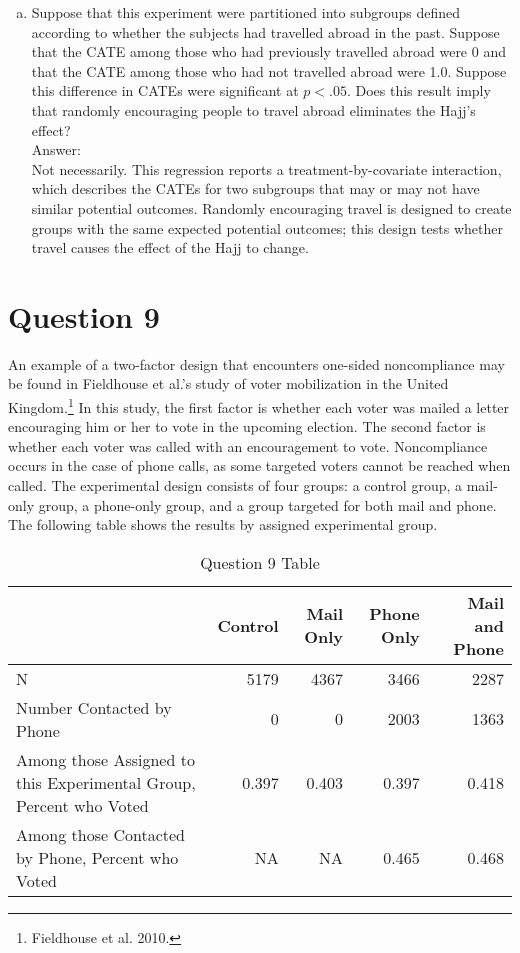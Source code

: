 \documentclass[11pt,notitlepage]{article}\usepackage[]{graphicx}\usepackage[]{color}
\begin{document}
\begin{enumerate}[a)]
\item Suppose that this experiment were partitioned into subgroups defined according to whether the subjects had travelled abroad in the past. Suppose that the CATE among those who had previously travelled abroad were 0 and that the CATE among those who had not travelled abroad were 1.0. Suppose this difference in CATEs were significant at $p< .05$. Does this result imply that randomly encouraging people to travel abroad eliminates the Hajj's effect?\\
Answer:\\
Not necessarily.  This regression reports a treatment-by-covariate interaction, which describes the CATEs for two subgroups that may or may not have similar potential outcomes.  Randomly encouraging travel is designed to create groups with the same expected potential outcomes; this design tests whether travel causes the effect of the Hajj to change.

\end{enumerate}
\section*{Question 9}
An example of a two-factor design that encounters one-sided noncompliance may be found in Fieldhouse et al.'s study of voter mobilization in the United Kingdom.\footnote{Fieldhouse et al. 2010.} In this study, the first factor is whether each voter was mailed a letter encouraging him or her to vote in the upcoming election. The second factor is whether each voter was called with an encouragement to vote. Noncompliance occurs in the case of phone calls, as some targeted voters cannot be reached when called. The experimental design consists of four groups: a control group, a mail-only group, a phone-only group, and a group targeted for both mail and phone. The following table shows the results by assigned experimental group.
\begin{table}[htbp]
  \centering
  \caption{Question 9 Table}
    \begin{tabular}{R{5cm}rrrr}
    \toprule
          & Control  & Mail Only  & Phone Only  & Mail and Phone  \\
    \midrule
    N     & 5179  & 4367  & 3466  & 2287 \\
    Number Contacted by Phone  & 0     & 0     & 2003  & 1363 \\
    Among those Assigned to this Experimental Group, Percent who Voted  & 0.397 & 0.403 & 0.397 & 0.418 \\
    Among those Contacted by Phone, Percent who Voted  & NA    & NA    & 0.465 & 0.468 \\
    \bottomrule
    \end{tabular}%
  \label{tab:addlabel}%
\end{table}%
\end{document}
